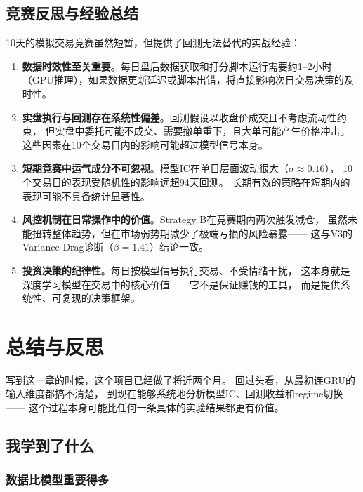 \documentclass[12pt,a4paper]{ctexart}
\begin{document}
\subsection{竞赛反思与经验总结}

10天的模拟交易竞赛虽然短暂，但提供了回测无法替代的实战经验：

\begin{enumerate}[leftmargin=*]
    \item \textbf{数据时效性至关重要}。每日盘后数据获取和打分脚本运行需要约1--2小时
          （GPU推理），如果数据更新延迟或脚本出错，将直接影响次日交易决策的及时性。
    \item \textbf{实盘执行与回测存在系统性偏差}。回测假设以收盘价成交且不考虑流动性约束，
          但实盘中委托可能不成交、需要撤单重下，且大单可能产生价格冲击。
          这些因素在10个交易日内的影响可能超过模型信号本身。
    \item \textbf{短期竞赛中运气成分不可忽视}。模型IC在单日层面波动很大（$\sigma\approx0.16$），
          10个交易日的表现受随机性的影响远超94天回测。
          长期有效的策略在短期内的表现可能不具备统计显著性。
    \item \textbf{风控机制在日常操作中的价值}。Strategy B在竞赛期内两次触发减仓，
          虽然未能扭转整体趋势，但在市场弱势期减少了极端亏损的风险暴露——
          这与V3的Variance Drag诊断（$\beta=1.41$）结论一致。
    \item \textbf{投资决策的纪律性}。每日按模型信号执行交易、不受情绪干扰，
          这本身就是深度学习模型在交易中的核心价值——它不是保证赚钱的工具，
          而是提供系统性、可复现的决策框架。
\end{enumerate}

\section{总结与反思}

写到这一章的时候，这个项目已经做了将近两个月。
回过头看，从最初连GRU的输入维度都搞不清楚，
到现在能够系统地分析模型IC、回测收益和regime切换——
这个过程本身可能比任何一条具体的实验结果都更有价值。

\subsection{我学到了什么}

\subsubsection{数据比模型重要得多}
\end{document}
